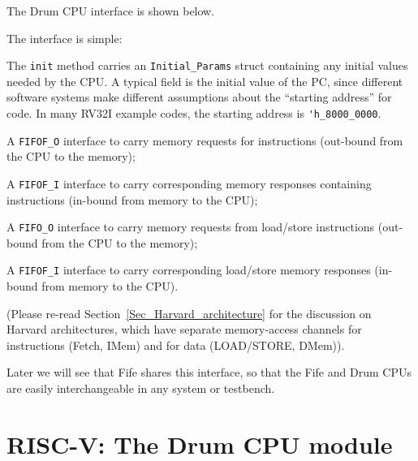 \label{Sec_Drum_CPU_interface}


The Drum CPU interface is shown below.



The interface is simple:

\begin{tightlist}

  \item The \verb|init| method carries an \verb|Initial_Params| struct
    containing any initial values needed by the CPU.  A typical field
    is the initial value of the PC, since different software systems
    make different assumptions about the ``starting address'' for
    code.  In many RV32I example codes, the starting address is
    \verb|'h_8000_0000|.

  \item A \verb|FIFOF_O| interface to carry memory requests for
    instructions (out-bound from the CPU to the memory);

  \item A \verb|FIFOF_I| interface to carry corresponding memory
    responses containing instructions (in-bound from memory to the
    CPU);

  \item A \verb|FIFO_O| interface to carry memory requests from
    load/store instructions (out-bound from the CPU to the memory);

  \item A \verb|FIFOF_I| interface to carry corresponding load/store
    memory responses (in-bound from memory to the CPU).

\end{tightlist}

(Please re-read Section~\ref{Sec_Harvard_architecture} for the
discussion on Harvard architectures, which have separate memory-access
channels for instructions (Fetch, IMem) and for data (LOAD/STORE,
DMem)).

Later we will see that Fife shares this interface, so that the Fife
and Drum CPUs are easily interchangeable in any system or testbench.


\section{RISC-V: The Drum CPU module}

